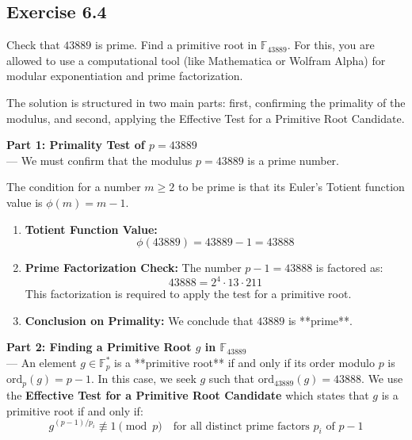 \subsection*{Exercise 6.4}
    Check that $43889$ is prime. Find a primitive root in $\mathbb{F}_{43889}$. For this, you are allowed to use a computational tool (like Mathematica or Wolfram Alpha) for modular exponentiation and prime factorization.

    
    \begin{solution}
    The solution is structured in two main parts: first, confirming the primality of the modulus, and second, applying the Effective Test for a Primitive Root Candidate.
    
    \textbf{Part 1: Primality Test of $p=43889$}\\
    ---
    We must confirm that the modulus $p=43889$ is a prime number.
    
    The condition for a number $m \ge 2$ to be prime is that its Euler's Totient function value is $\phi(m) = m-1$.
    \begin{enumerate}
        \item \textbf{Totient Function Value:} 
        $$\phi(43889) = 43889 - 1 = 43888$$
    
        \item \textbf{Prime Factorization Check:} The number $p-1 = 43888$ is factored as:
        $$43888 = 2^4 \cdot 13 \cdot 211$$
        This factorization is required to apply the test for a primitive root.
        
        \item \textbf{Conclusion on Primality:} We conclude that $43889$ is **prime**.
    \end{enumerate}
    
    \textbf{Part 2: Finding a Primitive Root $g$ in $\mathbb{F}_{43889}$}\\
    ---
    An element $g \in \mathbb{F}_{p}^{*}$ is a **primitive root** if and only if its order modulo $p$ is $\text{ord}_p(g) = p-1$.
    In this case, we seek $g$ such that $\text{ord}_{43889}(g) = 43888$. We use the \textbf{Effective Test for a Primitive Root Candidate} which states that $g$ is a primitive root if and only if:
    $$g^{(p-1)/p_i} \not\equiv 1 \pmod{p} \quad \text{for all distinct prime factors } p_i \text{ of } p-1$$
    

\end{solution}
